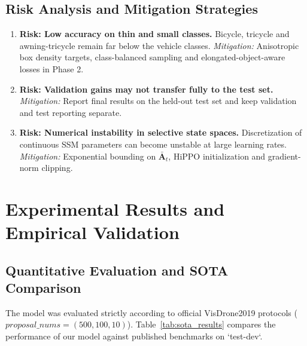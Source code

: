 \documentclass[12pt,a4paper]{report}
\begin{document}
\section{Risk Analysis and Mitigation Strategies}
\begin{enumerate}[leftmargin=2em]
    \item \textbf{Risk: Low accuracy on thin and small classes.} Bicycle, tricycle and awning-tricycle remain far below the vehicle classes.
    \textit{Mitigation:} Anisotropic box density targets, class-balanced sampling and elongated-object-aware losses in Phase 2.
    \item \textbf{Risk: Validation gains may not transfer fully to the test set.}
    \textit{Mitigation:} Report final results on the held-out test set and keep validation and test reporting separate.
    \item \textbf{Risk: Numerical instability in selective state spaces.} Discretization of continuous SSM parameters can become unstable at large learning rates.
    \textit{Mitigation:} Exponential bounding on $\mathbf{\bar{A}}_t$, HiPPO initialization and gradient-norm clipping.
\end{enumerate}

\chapter{Experimental Results and Empirical Validation}

\section{Quantitative Evaluation and SOTA Comparison}
The model was evaluated strictly according to official VisDrone2019 protocols ($ proposal\_nums=(500, 100, 10)$). Table~\ref{tab:sota_results} compares the performance of our model against published benchmarks on `test-dev`.
\end{document}
